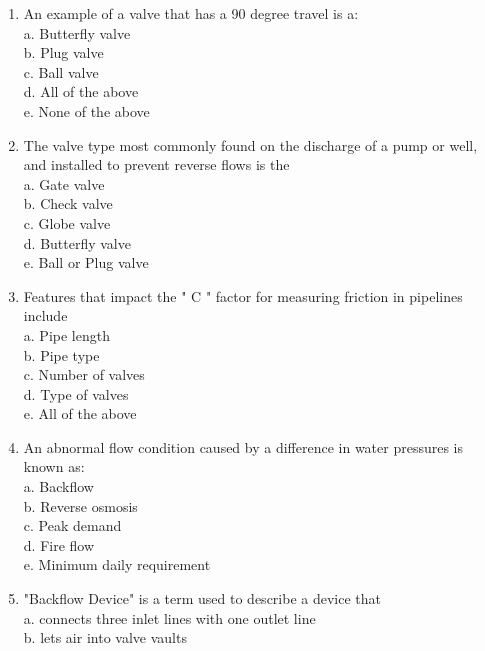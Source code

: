\documentclass{article}
\begin{document}
\begin{enumerate}[1.]
  \item An example of a valve that has a 90 degree travel is a:\\
a. Butterfly valve\\
b. Plug valve\\
c. Ball valve\\
d. All of the above\\
e. None of the above\\

  \item The valve type most commonly found on the discharge of a pump or well, and installed to prevent reverse flows is the\\
a. Gate valve\\
b. Check valve\\
c. Globe valve\\
d. Butterfly valve\\
e. Ball or Plug valve\\

  \item Features that impact the " C " factor for measuring friction in pipelines include\\
a. Pipe length\\
b. Pipe type\\
c. Number of valves\\
d. Type of valves\\
e. All of the above\\

  \item An abnormal flow condition caused by a difference in water pressures is known as:\\
a. Backflow\\

b. Reverse osmosis\\

c. Peak demand\\

d. Fire flow\\

e. Minimum daily requirement\\

\item "Backflow Device" is a term used to describe a device that\\
a. connects three inlet lines with one outlet line\\

b. lets air into valve vaults\\


\end{enumerate}
\end{document}
